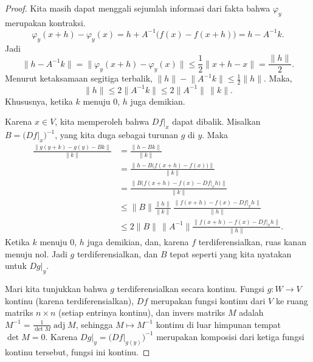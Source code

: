 \documentclass[12pt,openany]{book}
\newcommand{\snorm}[1]{\lVert {#1} \rVert}
\theoremstyle{plain}
\theoremstyle{remark}
\theoremstyle{definition}
\theoremstyle{exercise}
\theoremstyle{example}
\begin{document}
\begin{proof}
Kita masih dapat
menggali sejumlah informasi dari fakta bahwa $\varphi_y$ merupakan kontraksi.
\begin{equation*}
\varphi_y(x+h)-\varphi_y(x) = h + A^{-1} \bigl( f(x)-f(x+h) \bigr) = h - A^{-1} k .
\end{equation*}
Jadi
\begin{equation*}
\snorm{h-A^{-1}k} = \snorm{\varphi_y(x+h)-\varphi_y(x)} \leq
\frac{1}{2}\snorm{x+h-x} = \frac{\snorm{h}}{2}.
\end{equation*}
Menurut ketaksamaan segitiga terbalik, $\snorm{h} - \snorm{A^{-1}k} \leq
\frac{1}{2}\snorm{h}$.
Maka,
\begin{equation*}
\snorm{h} \leq 2 \snorm{A^{-1}k} \leq 2 \snorm{A^{-1}} \, \snorm{k}.
\end{equation*}
Khususnya, ketika $k$ menuju $0$, $h$ juga demikian.

Karena $x \in V$, kita memperoleh bahwa $Df|_x$ dapat dibalik.
Misalkan $B = \bigl(Df|_x\bigr)^{-1}$, yang kita duga sebagai turunan
$g$ di $y$.  Maka
\begin{equation*}
\begin{split}
\frac{\snorm{g(y+k)-g(y)-Bk}}{\snorm{k}}
& =
\frac{\snorm{h-Bk}}{\snorm{k}}
\\
& =
\frac{\snorm{h-B\bigl(f(x+h)-f(x)\bigr)}}{\snorm{k}}
\\
& =
\frac{\snorm{B\bigl(f(x+h)-f(x)-Df|_x h\bigr)}}{\snorm{k}}
\\
& \leq
\snorm{B}
\frac{\snorm{h}}{\snorm{k}}\,
\frac{\snorm{f(x+h)-f(x)-Df|_x h}}{\snorm{h}}
\\
& \leq
2\snorm{B} \, \snorm{A^{-1}}
\frac{\snorm{f(x+h)-f(x)-Df|_x h}}{\snorm{h}} .
\end{split}
\end{equation*}
Ketika $k$ menuju $0$, $h$ juga demikian,
dan, karena $f$ terdiferensialkan,
ruas kanan menuju nol.
Jadi $g$ terdiferensialkan, dan $B$
tepat seperti yang kita nyatakan untuk $Dg|_y$.

Mari kita tunjukkan bahwa $g$ terdiferensialkan
secara kontinu.
Fungsi $g \colon W \to V$ kontinu (karena terdiferensialkan),
$Df$ merupakan fungsi kontinu dari $V$
ke ruang matriks $n \times n$ (setiap entrinya kontinu),
dan invers matriks $M$ adalah $M^{-1} = \frac{1}{\det M} \operatorname{adj} M$,
sehingga $M \mapsto M^{-1}$ kontinu di luar himpunan tempat $\det M = 0$.
Karena
$Dg|_y = {\bigl( Df|_{g(y)}\bigr)}^{-1}$ merupakan komposisi
dari ketiga fungsi
kontinu tersebut, fungsi ini kontinu.
\end{proof}
\end{document}
